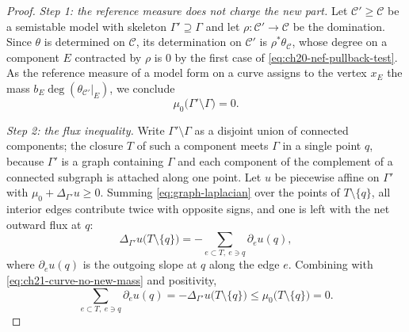 \begin{proof}
\emph{Step 1: the reference measure does not charge the new part.}  Let
\(\mathcal C'\geq\mathcal C\) be a semistable model with skeleton
\(\Gamma'\supseteq\Gamma\) and let \(\rho:\mathcal C'\to\mathcal C\) be the
domination.  Since \(\theta\) is determined on \(\mathcal C\), its
determination on \(\mathcal C'\) is \(\rho^*\theta_{\mathcal C}\), whose
degree on a component \(E\) contracted by \(\rho\) is \(0\) by the first
case of \eqref{eq:ch20-nef-pullback-test}.  As the reference measure of a
model form on a curve assigns to the vertex \(x_E\) the mass
\(b_E\deg(\theta_{\mathcal C'}|_E)\), we conclude
\begin{equation}
\label{eq:ch21-curve-no-new-mass}
 \mu_0\bigl(\Gamma'\setminus\Gamma\bigr)=0 .
\end{equation}

\emph{Step 2: the flux inequality.}  Write \(\Gamma'\setminus\Gamma\) as a
disjoint union of connected components; the closure \(T\) of such a
component meets \(\Gamma\) in a single point \(q\), because \(\Gamma'\) is a
graph containing \(\Gamma\) and each component of the complement of a
connected subgraph is attached along one point.  Let \(u\) be piecewise
affine on \(\Gamma'\) with \(\mu_0+\Delta_{\Gamma'}u\geq0\).  Summing
\eqref{eq:graph-laplacian} over the points of \(T\setminus\{q\}\), all
interior edges contribute twice with opposite signs, and one is left with
the net outward flux at \(q\):
\[
 \Delta_{\Gamma'}u\bigl(T\setminus\{q\}\bigr)
 =-\sum_{e\subset T,\ e\ni q}\partial_e u(q),
\]
where \(\partial_e u(q)\) is the outgoing slope at \(q\) along the edge
\(e\).  Combining with \eqref{eq:ch21-curve-no-new-mass} and positivity,
\begin{equation}
\label{eq:ch21-curve-flux}
 \sum_{e\subset T,\ e\ni q}\partial_e u(q)
 =-\Delta_{\Gamma'}u\bigl(T\setminus\{q\}\bigr)
 \leq\mu_0\bigl(T\setminus\{q\}\bigr)=0 .
\end{equation}


\end{proof}
